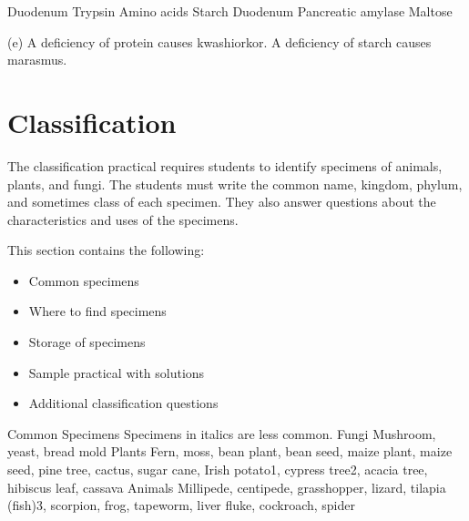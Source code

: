 \begin{enumerate}
Duodenum
Trypsin
Amino acids
Starch
Duodenum
Pancreatic amylase
Maltose

(e) A deficiency of protein causes kwashiorkor. A deficiency of starch causes marasmus.

\section{Classification}

The classification practical requires students to identify specimens of animals, plants, and fungi. The students must write the common name, kingdom, phylum, and sometimes class of each specimen. They also answer questions about the characteristics and uses of the specimens.

This section contains the following:
\begin{itemize}
\item{Common specimens}
\item{Where to find specimens}
\item{Storage of specimens}
\item{Sample practical with solutions}
\item{Additional classification questions}
\end{itemize}

Common Specimens
Specimens in italics are less common.
Fungi
  Mushroom, yeast, bread mold
Plants
  Fern, moss, bean plant, bean seed, maize plant, maize seed, pine tree, cactus, sugar cane, Irish potato1, cypress tree2, acacia tree, hibiscus leaf, cassava
Animals
  Millipede, centipede, grasshopper, lizard, tilapia (fish)3, scorpion, frog, tapeworm, liver fluke, cockroach, spider


\end{enumerate}
